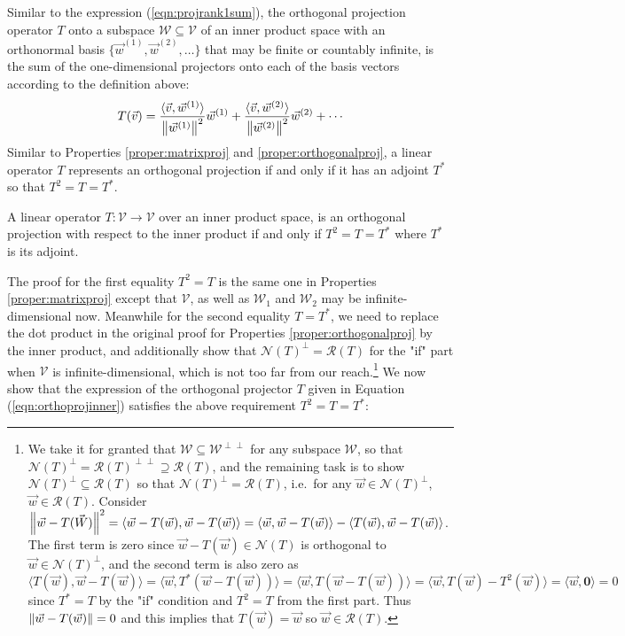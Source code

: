 Similar to the expression (\ref{eqn:projrank1sum}), the orthogonal projection operator $T$ onto a subspace $\mathcal{W} \subseteq \mathcal{V}$ of an inner product space with an orthonormal basis $\{\vec{w}^{(1)}, \vec{w}^{(2)}, \ldots\}$ that may be finite or countably infinite, is the sum of the one-dimensional projectors onto each of the basis vectors according to the definition above:
\begin{align}
T(\vec{v}) = \frac{\langle \vec{v}, \vec{w}^{(1)}\rangle}{\norm{\vec{w}^{(1)}}^2} \vec{w}^{(1)} + \frac{\langle \vec{v}, \vec{w}^{(2)}\rangle}{\norm{\vec{w}^{(2)}}^2} \vec{w}^{(2)} + \cdots \label{eqn:orthoprojinner}
\end{align}
Similar to Properties \ref{proper:matrixproj} and \ref{proper:orthogonalproj}, a linear operator $T$ represents an orthogonal projection if and only if it has an adjoint $T^*$ so that $T^2 = T = T^*$.
\begin{proper}
A linear operator $T: \mathcal{V} \to \mathcal{V}$ over an inner product space, is an orthogonal projection with respect to the inner product if and only if $T^2 = T = T^*$ where $T^*$ is its adjoint.
\end{proper}
The proof for the first equality $T^2 = T$ is the same one in Properties \ref{proper:matrixproj} except that $\mathcal{V}$, as well as $\mathcal{W}_1$ and $\mathcal{W}_2$ may be infinite-dimensional now. Meanwhile for the second equality $T = T^*$, we need to replace the dot product in the original proof for Properties \ref{proper:orthogonalproj} by the inner product, and additionally show that $\mathcal{N}(T)^\perp = \mathcal{R}(T)$ for the "if" part when $\mathcal{V}$ is infinite-dimensional, which is not too far from our reach.\footnote{We take it for granted that $\mathcal{W} \subseteq \mathcal{W}^{\perp\perp}$ for any subspace $\mathcal{W}$, so that $\mathcal{N}(T)^\perp = \mathcal{R}(T)^{\perp\perp} \supseteq \mathcal{R}(T)$, and the remaining task is to show $\mathcal{N}(T)^\perp \subseteq \mathcal{R}(T)$ so that $\mathcal{N}(T)^\perp = \mathcal{R}(T)$, i.e.\ for any $\vec{w} \in \mathcal{N}(T)^\perp$, $\vec{w} \in \mathcal{R}(T)$. Consider $\norm{\vec{w} - T(\vec{W})}^2 = \langle \vec{w} - T(\vec{w}), \vec{w} - T(\vec{w}) \rangle = \langle \vec{w}, \vec{w} - T(\vec{w}) \rangle - \langle T(\vec{w}), \vec{w} - T(\vec{w}) \rangle$. The first term is zero since $\vec{w} - T(\vec{w}) \in \mathcal{N}(T)$ is orthogonal to $\vec{w} \in \mathcal{N}(T)^\perp$, and the second term is also zero as $\langle T(\vec{w}), \vec{w} - T(\vec{w}) \rangle = \langle \vec{w}, T^*(\vec{w} - T(\vec{w})) \rangle = \langle \vec{w}, T(\vec{w} - T(\vec{w})) \rangle = \langle \vec{w}, T(\vec{w}) - T^2(\vec{w}) \rangle = \langle \vec{w}, \textbf{0} \rangle = 0$ since $T^* = T$ by the "if" condition and $T^2 = T$ from the first part. Thus $\norm{\vec{w} - T(\vec{w})} = 0$ and this implies that $T(\vec{w}) = \vec{w}$ so $\vec{w} \in \mathcal{R}(T)$.} We now show that the expression of the orthogonal projector $T$ given in Equation (\ref{eqn:orthoprojinner}) satisfies the above requirement $T^2 = T = T^*$:
